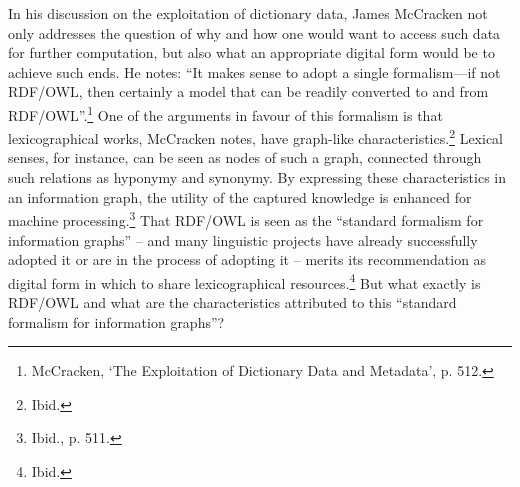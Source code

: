 In his discussion on the exploitation of dictionary data, James McCracken not only addresses the question of why and how one would want to access such data for further computation, but also what an appropriate digital form would be to achieve such ends. He notes: ``It makes sense to adopt a single formalism---if not RDF/OWL, then certainly a model that can be readily converted to and from RDF/OWL''.\footnote{McCracken, `The Exploitation of Dictionary Data and Metadata', p. 512.} One of the arguments in favour of this formalism is that lexicographical works, McCracken notes, have graph-like characteristics.\footnote{Ibid.} %
Lexical senses, for instance, can be seen as nodes of such a graph, connected through such relations as hyponymy and synonymy. By expressing these characteristics in an information graph, the utility of the captured knowledge is enhanced for machine processing.\footnote{Ibid., p. 511.} 
That RDF/OWL is seen as the ``standard formalism for information graphs'' -- and many linguistic projects have already successfully adopted it or are in the process of adopting it -- merits its recommendation as digital form in which to share lexicographical resources.\footnote{Ibid.} %
But what exactly is RDF/OWL and what are the characteristics attributed to this ``standard formalism for information graphs''?

